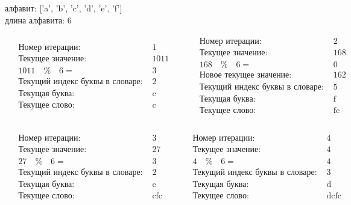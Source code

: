 \documentclass[letterpaper, 11pt]{extarticle}
\begin{document}
\newpage

\noindent алфавит: ['a', 'b', 'c', 'd', 'e', 'f'] \\ 
длина алфавита: 6

\begin{align*}
    \begin{aligned}
        & \text{Номер итерации: }& 1\\
        & \text{Текущее значение: }& 1011\\
        & 1011 \quad \% \quad 6 =&  3 \\
        & \text{Текущий индекс буквы в словаре: }& 2\\
        & \text{Текущая буква: }& \text{c}\\
        & \text{Текущее слово: }& \text{c}\\
    \end{aligned}
    \qquad
    \begin{aligned}
        & \text{Номер итерации: }& 2\\
        & \text{Текущее значение: }& 168\\
        & 168 \quad \% \quad 6 =&  0 \\
        & \text{Новое текущее значение: }& 162\\
        & \text{Текущий индекс буквы в словаре: }& 5\\
        & \text{Текущая буква: }& \text{f}\\
        & \text{Текущее слово: }& \text{fc}\\
    \end{aligned}
\end{align*}

\begin{align*}
    \begin{aligned}
        & \text{Номер итерации: }& 3\\
        & \text{Текущее значение: }& 27\\
        & 27 \quad \% \quad 6 =&  3 \\
        & \text{Текущий индекс буквы в словаре: }& 2\\
        & \text{Текущая буква: }& \text{c}\\
        & \text{Текущее слово: }& \text{cfc}\\
    \end{aligned}
    \qquad
    \begin{aligned}
        & \text{Номер итерации: }& 4\\
        & \text{Текущее значение: }& 4\\
        & 4 \quad \% \quad 6 =&  4 \\
        & \text{Текущий индекс буквы в словаре: }& 3\\
        & \text{Текущая буква: }& \text{d}\\
        & \text{Текущее слово: }& \text{dcfc}\\
    \end{aligned}
\end{align*}\\
\end{document}
